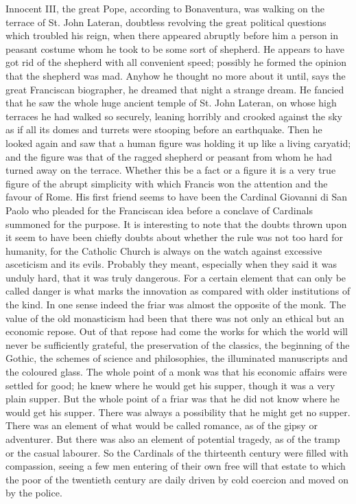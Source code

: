 \documentclass{book}
\begin{document}
Innocent III, the great Pope, according to Bonaventura, was walking on the terrace of St. John Lateran, doubtless revolving the great political questions which troubled his reign, when there appeared abruptly before him a person in peasant costume whom he took to be some sort of shepherd. He appears to have got rid of the shepherd with all convenient speed; possibly he formed the opinion that the shepherd was mad. Anyhow he thought no more about it until, says the great Franciscan biographer, he dreamed that night a strange dream. He fancied that he saw the whole huge ancient temple of St. John Lateran, on whose high terraces he had walked so securely, leaning horribly and crooked against the sky as if all its domes and turrets were stooping before an earthquake. Then he looked again and saw that a human figure was holding it up like a living caryatid; and the figure was that of the ragged shepherd or peasant from whom he had turned away on the terrace. Whether this be a fact or a figure it is a very true figure of the abrupt simplicity with which Francis won the attention and the favour of Rome. His first friend seems to have been the Cardinal Giovanni di San Paolo who pleaded for the Franciscan idea before a conclave of Cardinals summoned for the purpose. It is interesting to note that the doubts thrown upon it seem to have been chiefly doubts about whether the rule was not too hard for humanity, for the Catholic Church is always on the watch against excessive asceticism and its evils. Probably they meant, especially when they said it was unduly hard, that it was truly dangerous. For a certain element that can only be called danger is what marks the innovation as compared with older institutions of the kind. In one sense indeed the friar was almost the opposite of the monk. The value of the old monasticism had been that there was not only an ethical but an economic repose. Out of that repose had come the works for which the world will never be sufficiently grateful, the preservation of the classics, the beginning of the Gothic, the schemes of science and philosophies, the illuminated manuscripts and the coloured glass. The whole point of a monk was that his economic affairs were settled for good; he knew where he would get his supper, though it was a very plain supper. But the whole point of a friar was that he did not know where he would get his supper. There was always a possibility that he might get no supper. There was an element of what would be called romance, as of the gipsy or adventurer. But there was also an element of potential tragedy, as of the tramp or the casual labourer. So the Cardinals of the thirteenth century were filled with compassion, seeing a few men entering of their own free will that estate to which the poor of the twentieth century are daily driven by cold coercion and moved on by the police.
\end{document}
